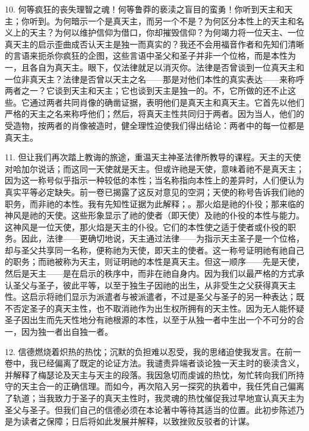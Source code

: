10. 何等疯狂的丧失理智之魂！何等鲁莽的亵渎之盲目的蛮勇！你听到天主和天主；你听到。为何暗示一个是真天主，而另一个不是？为何区分本性上的天主和名义上的天主？为何以维护信仰为借口，你却摧毁信仰？为何竭力将一位天主、一位真天主的启示歪曲成否认天主是独一而真实的？我还不会用福音作者和先知们清晰的言语来扼杀你疯狂的企图，这些言语中圣父和圣子并非一个位格，而是本性为一，且各自为真天主。眼下，仅法律就足以消灭你。法律是否曾谈到一位真天主和一位非真天主？法律是否曾以天主之名——那是对他们本性的真实表达——来称呼两者之一？它谈到天主和天主；它也谈到天主是独一的。不，它所做的还不止这些。它通过两者共同肖像的确凿证据，表明他们是真天主和真天主。它首先以他们严格的天主之名来称呼他们；然后，将真天主性共同归于两者。因为当人，他们的受造物，按两者的肖像被造时，健全理性迫使我们得出结论：两者中的每一位都是真天主。\par

11. 但让我们再次踏上教诲的旅途，重温天主神圣法律所教导的课程。天主的天使对哈加尔说话；而这同一天使就是天主。但或许祂是天使，意味着祂不是真天主；因为这一称号似乎指示一种较低的本性；当名称指向本性上的差异时，人们便认为真实平等必定缺失。前一卷已揭露了这反对意见的空洞；天使的称号告诉我们祂的职务，而非祂的本性。我有先知性证据为此解释；。那火焰是祂的仆役；那来临的神风是祂的天使。这些形象显示了祂的使者（即天使）及祂的仆役的本性与能力。这神风是一位天使，那火焰是天主的仆役。它们的本性使之适于使者或仆役的职务。因此，法律——更确切地说，天主通过法律——为指示天主圣子是一个位格，却与圣父共享同一名称，便称祂为天使，即天主的使者。这一称号证明祂有祂自己的职务；而祂被称为天主，则证明祂的本性是真天主。但这一顺序——先是天使，然后是天主——是在启示的秩序中，而非在祂自身内。因为我们以最严格的方式承认圣父与圣子，彼此平等，以至于独生子因祂的出生，从非受生之父获得真天主性。这启示将祂们显示为派遣者与被派遣者，不过是圣父与圣子的另一种表达；既不否定圣子的真天主性，也不取消祂作为出生权所拥有的天主性。因为无人能怀疑圣子因出生而先天性地分有祂根源的本性，以至于从独一者中生出一个不可分的合一，因为独一者出自独一者。\par

12. 信德燃烧着炽热的热忱；沉默的负担难以忍受，我的思绪迫使我发言。在前一卷中，我已经偏离了既定的论证方法。我谴责异端者谈论独一天主时的亵渎含义，并解释了梅瑟论及天主与天主的段落。我因急切而虔诚的热忱，匆忙转向我们所持守的天主合一的正确信理。而如今，再次陷入另一探究的执着中，我任凭自己偏离了轨道；当我致力于圣子的真天主性时，我灵魂的热忱催促我过早地宣认真天主为圣父与圣子。但我们自己的信德必须在本论著中等待其适当的位置。此初步陈述乃是为读者之保障；日后将如此发展并解释，以致挫败反驳者的计谋。\par


